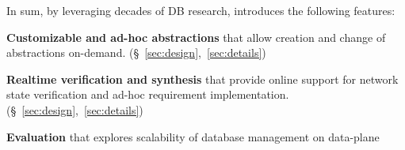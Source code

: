 
In sum, by leveraging decades of DB research, \Sys introduces the
following features:

\vspace{-1.5mm}
\begin{compactList}
\item \textbf{Customizable and ad-hoc abstractions} that allow
  creation and change of abstractions
  on-demand. (\S~\ref{sec:design},~\ref{sec:details}) \vspace{-1.5mm}
\item \textbf{Realtime verification and synthesis} 
that provide online support for network state verification and ad-hoc
requirement implementation. (\S~\ref{sec:design},~\ref{sec:details})
\item \textbf{Evaluation} that explores scalability of database
  management on data-plane \vspace{-1.5mm}

\end{compactList}